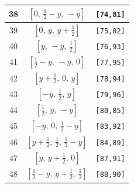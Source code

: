 \documentclass[fleqn,8pt]{jsarticle}
\begin{document}
\begin{longtable}{ccc}
38 & $\left[ 0,\, \frac{1}{2} - y,\, - y \right]$ & {\tt [74,81]} \\ \hline
39 & $\left[ 0,\, y,\, y + \frac{1}{2} \right]$ & {\tt [75,82]} \\ \hline
40 & $\left[ y,\, - y,\, \frac{1}{2} \right]$ & {\tt [76,93]} \\ \hline
41 & $\left[ \frac{1}{2} - y,\, - y,\, 0 \right]$ & {\tt [77,95]} \\ \hline
42 & $\left[ y + \frac{1}{2},\, 0,\, y \right]$ & {\tt [78,94]} \\ \hline
43 & $\left[ - y,\, \frac{1}{2},\, y \right]$ & {\tt [79,96]} \\ \hline
44 & $\left[ \frac{1}{2},\, y,\, - y \right]$ & {\tt [80,85]} \\ \hline
45 & $\left[ - y,\, 0,\, \frac{1}{2} - y \right]$ & {\tt [83,92]} \\ \hline
46 & $\left[ y + \frac{1}{2},\, \frac{1}{2},\, \frac{1}{2} - y \right]$ & {\tt [84,89]} \\ \hline
47 & $\left[ y,\, y + \frac{1}{2},\, 0 \right]$ & {\tt [87,91]} \\ \hline
48 & $\left[ \frac{1}{2} - y,\, y + \frac{1}{2},\, \frac{1}{2} \right]$ & {\tt [88,90]} \\
\end{longtable}
\renewcommand{\arraystretch}{1.2}
\end{document}
